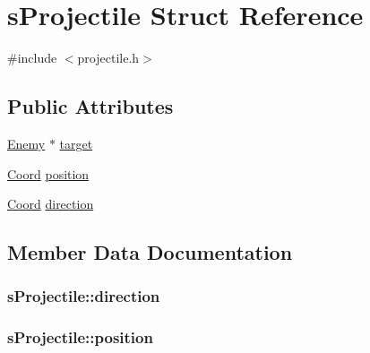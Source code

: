 \hypertarget{structs_projectile}{}\section{s\+Projectile Struct Reference}
\label{structs_projectile}


{\ttfamily \#include $<$projectile.\+h$>$}

\subsection*{Public Attributes}
\begin{DoxyCompactItemize}
\item 
\hyperlink{enemy_8h_ae3ac1c5e4d43de724487dfc83b509fd4}{Enemy} $\ast$ \hyperlink{structs_projectile_a3b940e8b5370b3c328d2ed3d9924dc8d}{target}
\item 
\hyperlink{coordonates_8h_aff9d4468ac7a973ce7e5cfb5bd39bc33}{Coord} \hyperlink{structs_projectile_a17ae15a48cf473955980cfe76227b617}{position}
\item 
\hyperlink{coordonates_8h_aff9d4468ac7a973ce7e5cfb5bd39bc33}{Coord} \hyperlink{structs_projectile_a1bb47c3b0ac3cbe0230b2bb12b5c37fe}{direction}
\end{DoxyCompactItemize}


\subsection{Member Data Documentation}
\hypertarget{structs_projectile_a1bb47c3b0ac3cbe0230b2bb12b5c37fe}{}
\subsubsection[{direction}]{ s\+Projectile\+::direction}\label{structs_projectile_a1bb47c3b0ac3cbe0230b2bb12b5c37fe}
\hypertarget{structs_projectile_a17ae15a48cf473955980cfe76227b617}{}
\subsubsection[{position}]{ s\+Projectile\+::position}\label{structs_projectile_a17ae15a48cf473955980cfe76227b617}
\hypertarget{structs_projectile_a3b940e8b5370b3c328d2ed3d9924dc8d}{}
